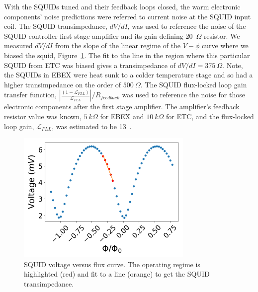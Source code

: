 With the \ac{SQUID}s tuned and their feedback loops closed, the warm electronic components' noise predictions were referred to current noise at the \ac{SQUID} input coil.
The \ac{SQUID} transimpedance, $dV/dI$, was used to reference the noise of the \ac{SQUID} controller first stage amplifier and its gain defining 20~$\Omega$ resistor. 
We measured $dV/dI$ from the slope of the linear regime of the $V-\phi$ curve where we biased the squid, Figure~\ref{fig:squid_transimpedance}. 
The fit to the line in the region where this particular \ac{SQUID} from \ac{ETC} was biased gives a transimpedance of $dV/dI=375~\Omega$. 
Note, the \ac{SQUID}s in \ac{EBEX} were heat sunk to a colder temperature stage and so had a higher transimpedance on the order of $500~\Omega$. 
The \ac{SQUID} flux-locked loop gain transfer function, $|\frac{(1-\mathscr{L}_{FLL})}{\mathscr{L}_{FLL}}|/R_{feedback}$ was used to reference the noise for those electronic components after the first stage amplifier. 
The amplifier's feedback resistor value was known, $5~k\Omega$ for \ac{EBEX} and $10~k\Omega$ for \ac{ETC}, and the flux-locked loop gain, $\mathscr{L}_{FLL}$, was estimated to be 13~\cite{Hubmayr2009}.

\begin{figure}[ht!]
\begin{center}
\includegraphics[height=2.5in]{figures/vphi_physical.png}
\caption{\ac{SQUID} voltage versus flux curve. The operating regime is highlighted (red) and fit to a line (orange) to get the \ac{SQUID} transimpedance.
\label{fig:squid_transimpedance} }
\end{center}
\end{figure}

